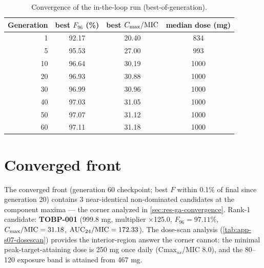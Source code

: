 \begin{table}[htbp]
\centering
\caption{Convergence of the in-the-loop run (best-of-generation).}
\label{tab:app-ga-conv}
\begin{tabular}{rccc}
\toprule
Generation & best $F_{96}$ (\%) & best $C_{\max}/\mathrm{MIC}$ & median dose (mg) \\
\midrule
1 & 92.17 & 20.40 & 834 \\
5 & 95.53 & 27.00 & 993 \\
10 & 96.64 & 30.19 & 1000 \\
20 & 96.93 & 30.88 & 1000 \\
30 & 96.99 & 30.96 & 1000 \\
40 & 97.03 & 31.05 & 1000 \\
50 & 97.07 & 31.12 & 1000 \\
60 & 97.11 & 31.18 & 1000 \\
\bottomrule
\end{tabular}
\end{table}

\section{Converged front}
The converged front (generation 60 checkpoint; best $F$ within 0.1\% of final since generation 20) contains 3 near-identical non-dominated candidates at the component maxima --- the corner analyzed in \cref{sec:res-ga-convergence}. Rank-1 candidate: \textbf{TOBP-001} (999.8 mg, multiplier $\times$125.0, $F_{96} = 97.11\%$, $C_{\max}/\mathrm{MIC} = 31.18$, $\mathrm{AUC}_{24}/\mathrm{MIC} = 172.33$). The dose-scan analysis (\cref{tab:app-s07-dosescan}) provides the interior-region answer the corner cannot: the minimal peak-target-attaining dose is 250 mg once daily (Cmax$_{ss}$/MIC 8.0), and the 80--120 exposure band is attained from 467 mg.
